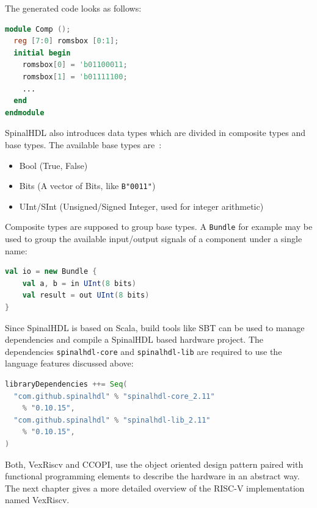 \documentclass[twoside,twocolumn]{article}
\newcommand{\code}[1]{\texttt{#1}}
\begin{document}
\noindent The generated code looks as follows:
\begin{lstlisting}[language=verilog]
module Comp ();
  reg [7:0] romsbox [0:1];
  initial begin
    romsbox[0] = 'b01100011;
    romsbox[1] = 'b01111100;
    ...
  end
endmodule
\end{lstlisting}
SpinalHDL also introduces data types which are divided in composite
types and base types. The available base types are~\cite{spinal_doc2}:
\begin{itemize}
    \item Bool (True, False)
    \item Bits (A vector of Bits, like \code{B"0011"})
    \item UInt/SInt (Unsigned/Signed Integer, used for integer
        arithmetic)
\end{itemize}
Composite types are supposed to group base types. A \code{Bundle} for
example may be used to group the available input/output signals of a
component under a single name:
\begin{lstlisting}[language=scala]
val io = new Bundle {
    val a, b = in UInt(8 bits)
    val result = out UInt(8 bits)
}
\end{lstlisting}
Since SpinalHDL is based on Scala, build tools like SBT can be used to
manage dependencies and compile a SpinalHDL based hardware project. The
dependencies \code{spinalhdl-core} and \code{spinalhdl-lib} are required
to use the language features discussed above:
\begin{lstlisting}[language=scala]
libraryDependencies ++= Seq(
  "com.github.spinalhdl" % "spinalhdl-core_2.11" 
    % "0.10.15",
  "com.github.spinalhdl" % "spinalhdl-lib_2.11" 
    % "0.10.15",
)
\end{lstlisting}

Both, VexRiscv and CCOPI, use the object oriented design pattern paired
with functional programming elements to describe the hardware in an
abstract way. The next chapter gives a more detailed overview of the
RISC-V implementation named VexRiscv.
\end{document}
